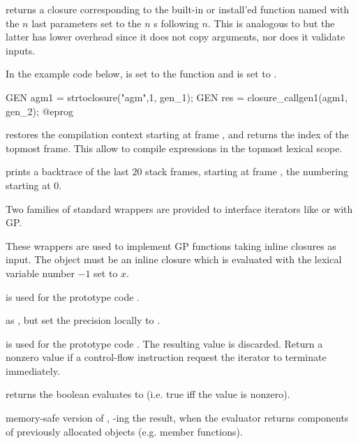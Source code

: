 returns a closure
corresponding to the built-in or install'ed function named  with the
$n$ last parameters set to the $n$ s following $n$. This is
analogous to  but the latter has
lower overhead since it does not copy arguments, nor does it validate inputs.

In the example code below,  is set to the function
 and  is set to .

\bprog
  GEN agm1 = strtoclosure("agm",1, gen_1);
  GEN res = closure_callgen1(agm1, gen_2);
@eprog

 restores the compilation context starting
at frame , and returns the index of the topmost frame. This allow to
compile expressions in the topmost lexical scope.

 prints a backtrace of the last $20$ stack
frames, starting at frame , the numbering starting at $0$.

Two families of standard wrappers are provided to interface iterators like
 or  with GP.

These wrappers are used to implement GP functions taking inline closures as
input. The object  must be an inline closure which is evaluated
with the lexical variable number $-1$ set to $x$.

 is used for the prototype code .

 as , but
set the precision locally to .

 is used for the prototype code
. The resulting value is discarded.  Return a nonzero value if a
control-flow instruction request the iterator to terminate immediately.

 returns the boolean
 evaluates to (i.e. true iff the value is nonzero).

 memory-safe version of ,
-ing the result, when the evaluator returns components of
previously allocated objects (e.g. member functions).

